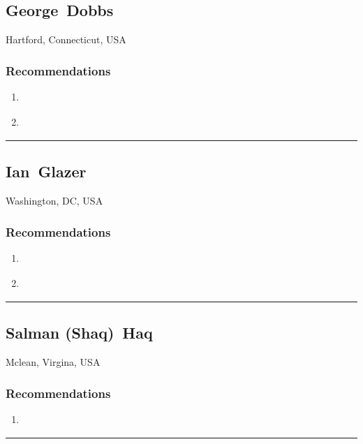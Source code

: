 \subsection{George~Dobbs} \textsf{Hartford, Connecticut, USA} \smallskip {} \sffamily  \medskip \subsubsection{Recommendations}\begin{enumerate}
\item \cite{Cameron2005}
\item \cite{Hoffman1977}
\end{enumerate}\noindent\rule{\textwidth}{0.2pt}

\subsection{Ian~Glazer} \textsf{Washington, DC, USA} \smallskip {} \sffamily  \medskip \subsubsection{Recommendations}\begin{enumerate}
\item \cite{Clippinger2007}
\item \cite{Richer2017}
\end{enumerate}\noindent\rule{\textwidth}{0.2pt}

\subsection{Salman (Shaq)~Haq} \textsf{Mclean, Virgina, USA} \smallskip {} \sffamily  \medskip \subsubsection{Recommendations}\begin{enumerate}
\item \cite{Windley2005}
\end{enumerate}\noindent\rule{\textwidth}{0.2pt}

